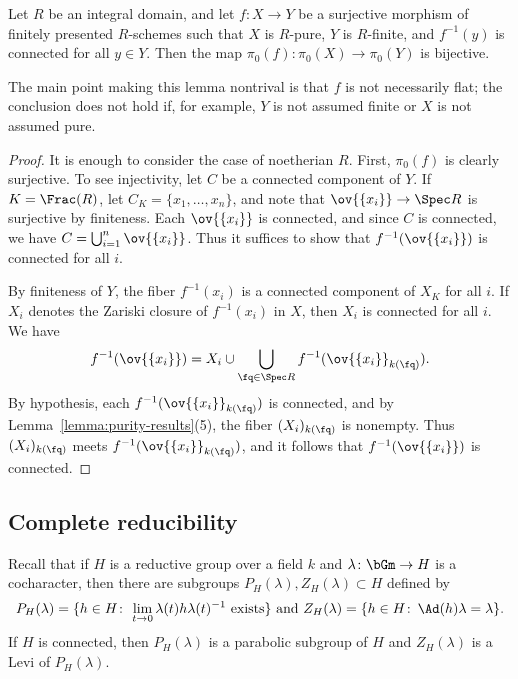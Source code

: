 \begin{lemma}\label{lemma:pure-to-finite-connected}
    Let $R$ be an integral domain, and let $f\colon X \to Y$ be a surjective morphism of finitely presented $R$-schemes such that $X$ is $R$-pure, $Y$ is $R$-finite, and $f^{-1}(y)$ is connected for all $y \in Y$. Then the map $\pi_0(f)\colon \pi_0(X) \to \pi_0(Y)$ is bijective.
\end{lemma}

The main point making this lemma nontrival is that $f$ is not necessarily flat; the conclusion does not hold if, for example, $Y$ is not assumed finite or $X$ is not assumed pure.

\begin{proof}
    It is enough to consider the case of noetherian $R$. First, $\pi_0(f)$ is clearly surjective. To see injectivity, let $C$ be a connected component of $Y$. If $K = \Frac(R)$, let $C_K = \{x_1, \dots, x_n\}$, and note that $\ov{\{x_i\}} \to \Spec R$ is surjective by finiteness. Each $\ov{\{x_i\}}$ is connected, and since $C$ is connected, we have $C = \bigcup_{i=1}^n \ov{\{x_i\}}$. Thus it suffices to show that $f^{-1}(\ov{\{x_i\}})$ is connected for all $i$.\smallskip
    
    By finiteness of $Y$, the fiber $f^{-1}(x_i)$ is a connected component of $X_K$ for all $i$. If $X_i$ denotes the Zariski closure of $f^{-1}(x_i)$ in $X$, then $X_i$ is connected for all $i$. We have
    \[
    f^{-1}(\ov{\{x_i\}}) = X_i \cup \bigcup_{\fq \in \Spec R} f^{-1}(\ov{\{x_i\}}_{k(\fq)}).
    \]
    By hypothesis, each $f^{-1}(\ov{\{x_i\}}_{k(\fq)})$ is connected, and by Lemma~\ref{lemma:purity-results}(5), the fiber $(X_i)_{k(\fq)}$ is nonempty. Thus $(X_i)_{k(\fq)}$ meets $f^{-1}(\ov{\{x_i\}}_{k(\fq)})$, and it follows that $f^{-1}(\ov{\{x_i\}})$ is connected.
\end{proof}






\subsection{Complete reducibility}\label{ss:cr}

Recall \cite[\S 2.1]{CGP} that if $H$ is a reductive group over a field $k$ and $\lambda\colon\bGm \to H$ is a cocharacter, then there are subgroups $P_H(\lambda), Z_H(\lambda) \subset H$ defined by
\[
P_H(\lambda) = \{h \in H\colon \, \lim_{t \to 0} \lambda(t)h\lambda(t)^{-1} \text{ exists}\} \text{ and }
Z_H(\lambda) = \{h \in H\colon \, \Ad(h)\lambda = \lambda\}.
\]
If $H$ is connected, then $P_H(\lambda)$ is a parabolic subgroup of $H$ and $Z_H(\lambda)$ is a Levi of $P_H(\lambda)$.\smallskip

